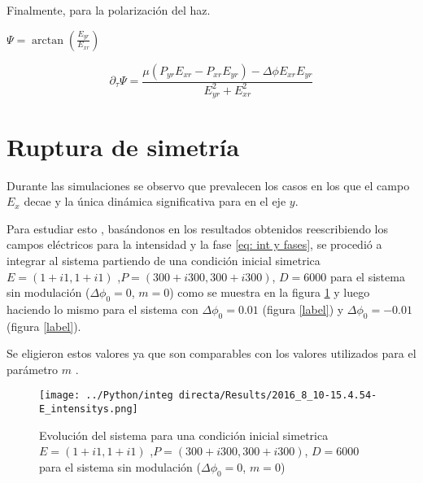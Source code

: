 			
			Finalmente, para la polarización del haz.
			
			$\Psi=\arctan(\frac{E_{yr} }{E_{xr} })$
			
			\begin{equation}
			\partial_{\tau}\Psi  = \frac{\mu(P_{yr}E_{xr}-P_{xr}E_{yr})-\Delta \phi E_{xr}E_{yr}}{E^2_{yr}+E^2_{xr}}
			\end{equation}
			
			
		
	
	\section{Ruptura de simetría}
		
		Durante las simulaciones se observo que prevalecen los casos en los que el campo $E_x$ decae y la única dinámica significativa para en el eje $y$.
		
		Para estudiar esto , basándonos en los resultados obtenidos reescribiendo los campos eléctricos para la intensidad y la fase \ref{eq: int y fases}, se procedió a integrar al sistema partiendo de una condición inicial simetrica $E=(1+i1,1+i1)$ ,$ P=(300+i300,300+i300)$, $D=6000$ para el sistema sin modulación ($\Delta \phi_0=0$, $m=0$) como se muestra en la figura \ref{fig: ci simetrica2} y luego haciendo lo mismo para el sistema con $\Delta \phi_0=0.01$ (figura \ref{label}) y $\Delta \phi_0=-0.01$ (figura \ref{label}).
		
		Se eligieron estos valores ya que son comparables con los valores utilizados para el parámetro $m$ .
		
		\begin{figure}[htc]
			
			\texttt{[image: ../Python/integ directa/Results/2016\_8\_10-15.4.54-E\_intensitys.png]}
			\caption{Evolución del sistema para una condición inicial simetrica $E=(1+i1,1+i1)$ ,$ P=(300+i300,300+i300)$, $D=6000$ para el sistema sin modulación ($\Delta \phi_0=0$, $m=0$)}
			\label{fig: ci simetrica2}
		\end{figure}
		

